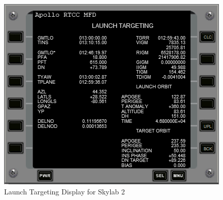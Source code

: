 \documentclass[11pt]{article} %
\begin{document}
\begin{figure}[hp]
	\centering
		\includegraphics{./ApolloRTCCMFDFiles/LaunchTargetingDisplay.png}
	\caption{Launch Targeting Display for Skylab 2}
	\label{fig:LaunchTargetingDisplayExample1}
\end{figure}
\end{document}
